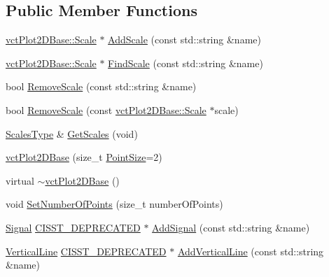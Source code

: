 \subsection*{Public Member Functions}
\begin{DoxyCompactItemize}
\item 
\hyperlink{classvct_plot2_d_base_1_1_scale}{vct\+Plot2\+D\+Base\+::\+Scale} $\ast$ \hyperlink{classvct_plot2_d_base_acedc5097bde86384c8dd84cb27eed287}{Add\+Scale} (const std\+::string \&name)
\item 
\hyperlink{classvct_plot2_d_base_1_1_scale}{vct\+Plot2\+D\+Base\+::\+Scale} $\ast$ \hyperlink{classvct_plot2_d_base_af6dba730fa291243216c223101966508}{Find\+Scale} (const std\+::string \&name)
\item 
bool \hyperlink{classvct_plot2_d_base_a9f8b9e6f26396cad098fe7c7f88b41d8}{Remove\+Scale} (const std\+::string \&name)
\item 
bool \hyperlink{classvct_plot2_d_base_a9b464b78057e628d6f208a4f126ca5b6}{Remove\+Scale} (const \hyperlink{classvct_plot2_d_base_1_1_scale}{vct\+Plot2\+D\+Base\+::\+Scale} $\ast$scale)
\item 
\hyperlink{classvct_plot2_d_base_a0f7274ebd354a06e7102b164f60b7d94}{Scales\+Type} \& \hyperlink{classvct_plot2_d_base_a28375b86e330bde95aaba1789c9aae1a}{Get\+Scales} (void)
\item 
\hyperlink{classvct_plot2_d_base_a40e6a876db4f3e43056271fea5d678ea}{vct\+Plot2\+D\+Base} (size\+\_\+t \hyperlink{classvct_plot2_d_base_a4f238d9c5cefdb5c623b4967ba0e678b}{Point\+Size}=2)
\item 
virtual \hyperlink{classvct_plot2_d_base_a20969e93b167cb1603433817c2ec3aa3}{$\sim$vct\+Plot2\+D\+Base} ()
\item 
void \hyperlink{classvct_plot2_d_base_a3280db43df3cd97945a4ce1420cc657d}{Set\+Number\+Of\+Points} (size\+\_\+t number\+Of\+Points)
\item 
\hyperlink{classvct_plot2_d_base_1_1_signal}{Signal} \hyperlink{cmn_portability_8h_a63da7164735f9501be651b1f2bbc0121}{C\+I\+S\+S\+T\+\_\+\+D\+E\+P\+R\+E\+C\+A\+T\+E\+D} $\ast$ \hyperlink{classvct_plot2_d_base_aee230728556354fafade60b50e8c9a4e}{Add\+Signal} (const std\+::string \&name)
\item 
\hyperlink{classvct_plot2_d_base_1_1_vertical_line}{Vertical\+Line} \hyperlink{cmn_portability_8h_a63da7164735f9501be651b1f2bbc0121}{C\+I\+S\+S\+T\+\_\+\+D\+E\+P\+R\+E\+C\+A\+T\+E\+D} $\ast$ \hyperlink{classvct_plot2_d_base_a36b73535fa077ac082a145b2d2aaf45d}{Add\+Vertical\+Line} (const std\+::string \&name)

\end{DoxyCompactItemize}
